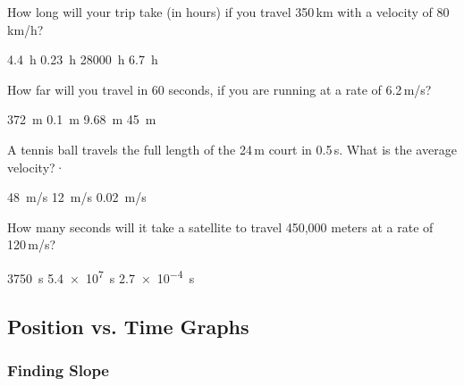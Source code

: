 \documentclass[]{exam}
\begin{document}
\begin{questions}
\question
How long will your trip take (in hours) if you travel 350\,km with a velocity of 80\,km/h?

\begin{randomizechoices}
    \correctchoice \SI{4.4}{h}
    \choice \SI{0.23}{h}
    \choice \SI{28000}{h}
    \choice \SI{6.7}{h}
\end{randomizechoices}

\question
How far will you travel in 60 seconds, if you are running at a rate of 6.2\,m/s?

\begin{randomizechoices}
    \correctchoice \SI{372}{m}
    \choice \SI{0.1}{m}
    \choice \SI{9.68}{m}
    \choice \SI{45}{m}
\end{randomizechoices}

\question
A tennis ball travels the full length of the 24\,m court in 0.5\,s. What is the average velocity?·

\begin{randomizeoneparchoices}
    \correctchoice \SI{48}{m/s}
    \choice \SI{12}{m/s}
    \choice \SI{0.02}{m/s}
\end{randomizeoneparchoices}

\question
How many seconds will it take a satellite to travel 450,000 meters at a rate of 120\,m/s?

\begin{randomizeoneparchoices}
    \correctchoice \SI{3750}{s}
    \choice \SI{5.4e7}{s}
    \choice \SI{2.7e-4}{s}
\end{randomizeoneparchoices}



\end{questions}

\clearpage

\subsection{Position vs. Time Graphs}

\subsubsection*{Finding Slope}
\end{document}
